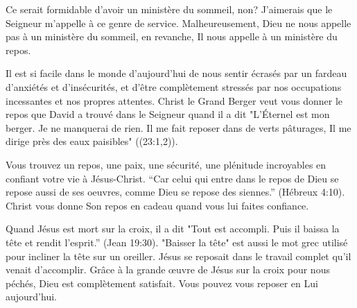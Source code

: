 

Ce serait formidable d'avoir un ministère du sommeil, non? J'aimerais que le Seigneur m'appelle à ce genre de service. Malheureusement, Dieu ne nous appelle pas à un ministère du sommeil, en revanche, Il nous appelle à un ministère du repos.

Il est si facile dans le monde d'aujourd'hui de nous sentir écrasés par un fardeau d'anxiétés et d'insécurités, et d'être complètement stressés par nos occupations incessantes et nos propres attentes. Christ le Grand Berger veut vous donner le repos que David a trouvé dans le Seigneur quand il a dit "L’Éternel est mon berger. Je ne manquerai de rien. Il me fait reposer dans de verts pâturages, Il me dirige près des eaux paisibles" ((23:1,2)).

Vous trouvez un repos, une paix, une sécurité, une plénitude incroyables en confiant votre vie à Jésus-Christ. “Car celui qui entre dans le repos de Dieu se repose aussi de ses oeuvres, comme Dieu se repose des siennes.” (Hébreux 4:10). Christ vous donne Son repos en cadeau quand vous lui faites confiance.

Quand Jésus est mort sur la croix, il a dit "Tout est accompli. Puis il baissa la tête et rendit l’esprit.” (Jean 19:30). "Baisser la tête" est aussi le mot grec utilisé pour incliner la tête sur un oreiller. Jésus se reposait dans le travail complet qu'il venait d'accomplir. Grâce à la grande œuvre de Jésus sur la croix pour nous péchés, Dieu est complètement satisfait. Vous pouvez vous reposer en Lui aujourd'hui.

